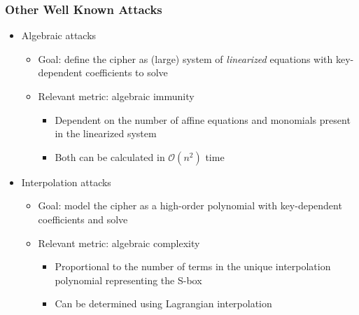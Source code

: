 \documentclass[10pt]{beamer}
\begin{document}
\begin{frame}
	\frametitle{Other Well Known Attacks}
	\begin{itemize}
		\item Algebraic attacks
		\begin{itemize}
			\item Goal: define the cipher as (large) system of \emph{linearized} equations with key-dependent coefficients to solve 
			\item Relevant metric: algebraic immunity
			\begin{itemize}
				\item Dependent on the number of affine equations and monomials present in the linearized system
				\item Both can be calculated in $\mathcal{O}(n^2)$ time
			\end{itemize}
		\end{itemize}
		\pause
		\item Interpolation attacks
		\begin{itemize}
			\item Goal: model the cipher as a high-order polynomial with key-dependent coefficients and solve
			\item Relevant metric: algebraic complexity
			\begin{itemize}
				\item Proportional to the number of terms in the unique interpolation polynomial representing the S-box
				\item Can be determined using Lagrangian interpolation
			\end{itemize}
		\end{itemize}
	\end{itemize}
\end{frame}


\end{document}
